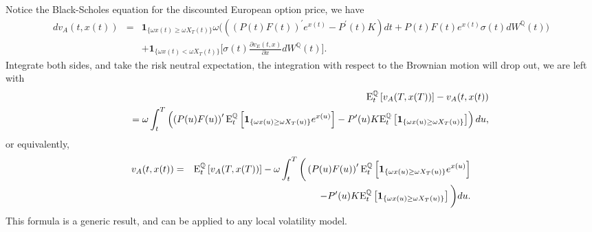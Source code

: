 \documentclass[12pt]{article}
\begin{document}
    Notice the Black-Scholes equation for the discounted European option price, we have
    \begin{eqnarray}
      dv_A(t,x(t))&=&\mathbf{1}_{\{\omega x(t)\geq\omega X_T(t)\}}\omega\bigg(\left(\left(P(t)F(t)\right)^{\prime}e^{x(t)}
                                                                          -P^{\prime}(t)K\right)dt
                                              +P(t)F(t)e^{x(t)} \sigma(t)dW^{\mathbb{Q}}(t)\bigg)\nonumber\\
               && + \mathbf{1}_{\{\omega x(t)<\omega X_T(t)\}}
                    \bigg[\sigma(t)\frac{\partial v_E(t,x)}{\partial x}dW^{\mathbb{Q}}(t)\bigg].
    \end{eqnarray}
    Integrate both sides, and take the risk neutral expectation, the integration with respect to the Brownian motion
    will drop out, we are left with
    \begin{eqnarray}
      &&{\rm E}_t^{\mathbb{Q}}\left[v_A(T,x(T))\right]-v_A(t,x(t)) \nonumber\\
      &&\quad=\omega\int_t^T\left(\left(P(u)F(u)\right)^{\prime}
               {\rm E}_t^{\mathbb{Q}}\left[\mathbf{1}_{\{\omega x(u)\geq\omega X_T(u)\}}e^{x(u)}\right]
               -P^{\prime}(u)K{\rm E}_t^{\mathbb{Q}}\left[\mathbf{1}_{\{\omega x(u)\geq\omega X_T(u)\}}\right]\right)du,
    \end{eqnarray}
    or equivalently,
    \begin{eqnarray}
      v_A(t,x(t))&=&{\rm E}_t^{\mathbb{Q}}\left[v_A(T,x(T))\right]-\omega\int_t^T\bigg(\left(P(u)F(u)\right)^{\prime}
               {\rm E}_t^{\mathbb{Q}}\left[\mathbf{1}_{\{\omega x(u)\geq\omega X_T(u)\}}e^{x(u)}\right]\nonumber\\
               &&\quad\quad\quad\quad\quad\quad\quad\quad\quad\quad\quad\quad\quad-P^{\prime}(u)K
               {\rm E}_t^{\mathbb{Q}}\left[\mathbf{1}_{\{\omega x(u)\geq\omega X_T(u)\}}\right]\bigg)du.
    \end{eqnarray}
    This formula is a generic result, and can be applied to any local volatility model.
\end{document}
